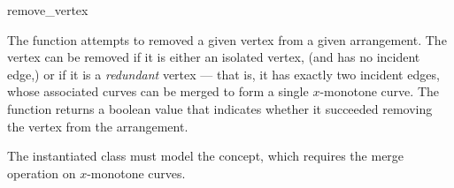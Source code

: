 \ccRefPageBegin

\begin{ccRefFunction}{remove_vertex}

\ccDefinition

The function \ccRefName{} attempts to removed a given vertex from a given
arrangement. The vertex can be removed if it is either an isolated vertex,
(and has no incident edge,) or if it is a {\em redundant} vertex --- that
is, it has exactly two incident edges, whose associated curves can be
merged to form a single $x$-monotone curve.
The function returns a boolean value that indicates whether it succeeded
removing the vertex from the arrangement.



\ccRequirements
The instantiated  class must model the
 concept, which requires the merge
operation on $x$-monotone curves.
	       
\end{ccRefFunction}

\ccRefPageEnd
